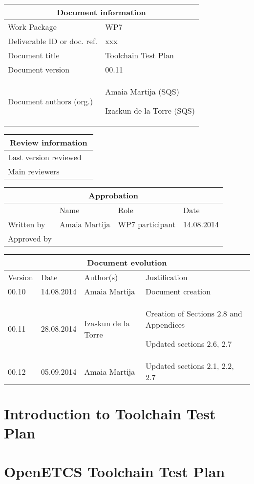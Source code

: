 \documentclass{template/openetcs_report}
\begin{document}
\begin{tabular}{|p{4.4cm}|p{8.7cm}|}
\hline
\multicolumn{2}{|c|}{Document information} \\
\hline
Work Package &  WP7  \\
Deliverable ID or doc. ref. & xxx\\
\hline
Document title & Toolchain Test Plan \\
Document version & 00.11 \\
Document authors (org.)  & Amaia Martija (SQS) 

Izaskun de la Torre (SQS)\\
\hline
\end{tabular}

\begin{tabular}{|p{4.4cm}|p{8.7cm}|}
\hline
\multicolumn{2}{|c|}{Review information} \\
\hline
Last version reviewed &  \\
\hline
Main reviewers &  \\
\hline
\end{tabular}

\begin{tabular}{|p{2.2cm}|p{4cm}|p{4cm}|p{2cm}|}
\hline
\multicolumn{4}{|c|}{Approbation} \\
\hline
  &  Name & Role & Date   \\
\hline  
Written by  &  Amaia Martija & WP7 participant & 14.08.2014 \\
\hline
Approved by &  &   &  \\
\hline
\end{tabular}

\begin{tabular}{|p{2.2cm}|p{2cm}|p{3cm}|p{5cm}|}
\hline
\multicolumn{4}{|c|}{Document evolution} \\
\hline
Version &  Date & Author(s) & Justification  \\
\hline  
00.10 & 14.08.2014 & Amaia Martija  &  Document creation  \\
\hline  
00.11 & 28.08.2014 & Izaskun de la Torre  &  Creation of Sections 2.8 and Appendices

Updated sections 2.6, 2.7  \\
\hline 
00.12 & 05.09.2014 & Amaia Martija  &  Updated sections 2.1, 2.2, 2.7  \\
\hline  
\end{tabular}
\newpage


\mainmatter







\chapter{Introduction to Toolchain Test Plan}
\label{chap:Test Plan introduction}




\chapter{OpenETCS Toolchain Test Plan}
\label{chap:test-plan}





\end{document}
